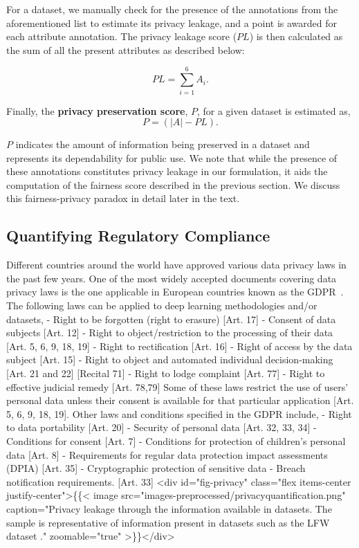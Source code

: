 \documentclass[journal]{IEEEtran}
\begin{document}
For a dataset, we manually check for the presence of the annotations from the aforementioned list to estimate its privacy leakage, and a point is awarded for each attribute annotation. The privacy leakage score ($PL$) is then calculated as the sum of all the present attributes as described below:

\begin{equation}
PL =\sum_{i=1}^{6} A_i.
\end{equation}

Finally, the \textbf{privacy preservation score}, $P$, for a given dataset is estimated as,
\begin{equation}
P = (|A| - PL).
\end{equation}

$P$ indicates the amount of information being preserved in a dataset and represents its dependability for public use. We note that while the presence of these annotations constitutes privacy leakage in our formulation, it aids the computation of the fairness score described in the previous section. We discuss this fairness-privacy paradox in detail later in the text.
\subsection{Quantifying Regulatory Compliance} Different countries around the world have approved various data privacy laws in the past few years. One of the most widely accepted documents covering data privacy laws is the one applicable in European countries known as the GDPR~\cite{regulation2016regulation}. The following laws can be applied to deep learning methodologies and/or datasets,
-  Right to be forgotten (right to erasure) [Art. 17]
-  Consent of data subjects [Art. 12]
-  Right to object/restriction to the processing of their data [Art. 5, 6, 9, 18, 19]
-  Right to rectification [Art. 16]
-  Right of access by the data subject [Art. 15]
-  Right to object and automated individual decision-making [Art. 21 and 22] [Recital 71]
-  Right to lodge complaint [Art. 77]
-  Right to effective judicial remedy [Art. 78,79]
\noindent Some of these laws restrict the use of users' personal data unless their consent is available for that particular application [Art. 5, 6, 9, 18, 19]. Other laws and conditions specified in the GDPR include,
-  Right to data portability [Art. 20]
-  Security of personal data [Art. 32, 33, 34]
-  Conditions for consent [Art. 7]
-  Conditions for protection of children's personal data [Art. 8]
-  Requirements for regular data protection impact assessments (DPIA) [Art. 35]
-  Cryptographic protection of sensitive data
-  Breach notification requirements. [Art. 33]
<div id="fig-privacy" class="flex items-center justify-center">\{\{< image src="images-preprocessed/privacyquantification.png" caption="Privacy leakage through the information available in datasets. The sample is representative of information present in datasets such as the LFW dataset \cite{huang2008labeled, liu2015deep}." zoomable="true" >\}\}</div>
\end{document}
